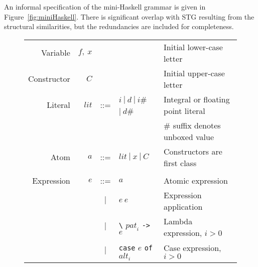\documentclass{llncs}
\begin{document}
An informal specification of the mini-Haskell grammar is given in
Figure~\ref{fig:miniHaskell}.  There is significant overlap with STG resulting
from the structural similarities, but the redundancies are included for
completeness.





\newcommand{\hash}{{\scriptsize\#}}

\begin{figure}
\centering
\footnotesize %
\begin{tabular}{r r c l l}
Variable         & $f,\ x$             &     &  & Initial lower-case letter \\

Constructor        & $C$                 &     & & Initial upper-case letter \\

Literal            & $\mathit{lit}$      & ::= & $i\ |\ d\ 
                                                 |\ i$\hash\ $|\ d$\hash & Integral or floating point literal \\

                   &                     &     &  & \# suffix denotes unboxed value \\

Atom               & $a$                 & ::= & $\mathit{lit}\ |\ x\ |\ C$ & Constructors are first class \\%
\\


Expression         & $e$                 & ::= & $a$ & Atomic expression \\

                   &                     & $|$ & $e\ e$ & Expression application \\

                   &                     & $|$ & \texttt{\textbackslash} $\mathit{pat}_i$ 
                                                 \texttt{->} $e$ & Lambda expression, $i > 0$ \\

                   &                     & $|$ & \texttt{case} $e$ \texttt{of} $\mathit{alt}_i$ & Case expression, $i > 0$\\


\end{tabular}
\end{figure}
\end{document}
